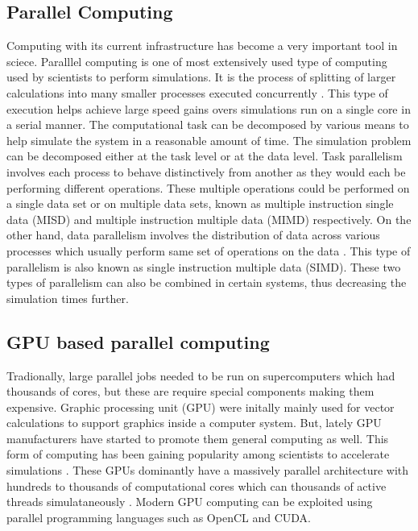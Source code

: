 \documentclass[preprint,10pt,authoryear]{elsarticle}
\begin{document}
\begin{linenumbers}
\subsection{Parallel Computing}
Computing with its current infrastructure has become a very important tool in sciece. 
Paralllel computing is one of most extensively used type of computing used by scientists 
to perform simulations. It is the process of splitting of larger calculations into 
many smaller processes executed concurrently \citep{Almasi1989}. This type of execution 
helps achieve large speed gains overs simulations run on a single core in a serial manner.
The computational task can be decomposed by various means to help simulate the system 
in a reasonable amount of time. The simulation problem can be decomposed either 
at the task level or at the data level. Task parallelism involves each process to 
behave distinctively from another as they would each be performing different operations. 
These multiple operations could be performed on a single data set or on multiple data 
sets, known as multiple instruction single data (MISD) and multiple instruction 
multiple data (MIMD) respectively. On the other hand, data parallelism 
involves the distribution of data across various processes which usually perform same set of 
operations on the data \citep{solihin2015}. This type of parallelism is also known 
as single instruction multiple data (SIMD). These two types of parallelism can also 
be combined in certain systems, thus decreasing the simulation times further.

\subsection{GPU based parallel computing}
Tradionally, large parallel jobs needed to be run on supercomputers which had thousands 
of cores, but these are require special components making them expensive.
Graphic processing unit (GPU) were initally mainly used for vector calculations to support 
graphics inside a computer system. But, lately GPU manufacturers have started to promote them 
general computing as well. This form of computing has been gaining popularity among scientists 
to accelerate simulations \citep{kandrot2011}. These GPUs dominantly have a 
massively parallel architecture with hundreds to thousands of computational cores 
which can thousands of active threads simulataneously \citep{keckler2011}. 
Modern GPU computing can be exploited using parallel programming languages 
such as OpenCL and CUDA. 


\end{linenumbers}
\end{document}
